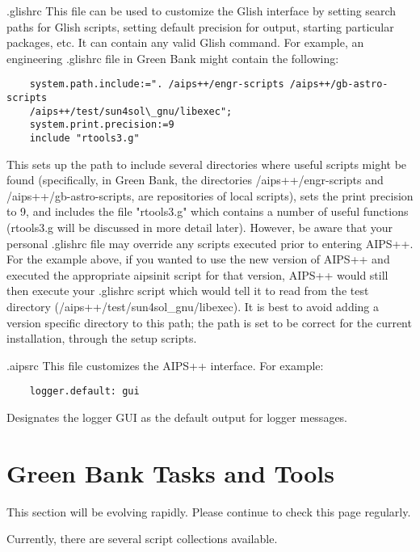 \begin{description}
\item{.glishrc} This file can be used to customize the Glish interface by
	setting search paths for Glish scripts, setting default precision for
	output, starting particular packages, etc. It can contain any valid
	Glish command. For example, an engineering .glishrc file in 
	Green Bank might contain the following:
\begin{verbatim}
	system.path.include:=". /aips++/engr-scripts /aips++/gb-astro-scripts 
	/aips++/test/sun4sol\_gnu/libexec";
	system.print.precision:=9
	include "rtools3.g"
\end{verbatim}
This sets up the path to include several directories where useful scripts
might be found (specifically, in Green Bank, the directories 
/aips++/engr-scripts and /aips++/gb-astro-scripts, are repositories of
local scripts), sets the print precision to 9, and includes the file
"rtools3.g" which contains a number of useful functions (rtools3.g will
be discussed in more detail later).
However, be aware that your personal .glishrc file may override any scripts
executed prior to entering AIPS++. For the example above, if you wanted to
use the new version of AIPS++ and executed the appropriate aipsinit script
for that version, AIPS++ would still then execute your .glishrc script which
would tell it to read from the test directory 
(/aips++/test/sun4sol\_gnu/libexec). It is best to avoid adding a version
specific directory to this path; the path is set to be correct for the
current installation, through the setup scripts.

\item{.aipsrc} This file customizes the AIPS++ interface. For example:
\begin{verbatim}
	logger.default: gui
\end{verbatim}
Designates the logger GUI as the default output for logger messages.
\end{description}
\bigskip

\section{Green Bank Tasks and Tools}
 
This section will be evolving rapidly. Please continue to check this
page regularly.

Currently, there are several script collections available. 

